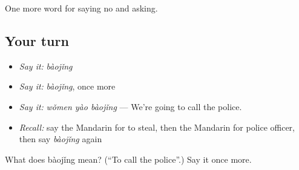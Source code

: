 \begin{grammarlens}[title={What you've built}]
One more word for saying no and asking.
\end{grammarlens}

\subsection*{Your turn}
\begin{itemize}
\raggedright
  \item \emph{Say it:} \emph{bàojǐng}
  \item \emph{Say it:} \emph{bàojǐng}, once more
  \item \emph{Say it:} \emph{wǒmen yào bàojǐng} — We're going to call the police.
  \item \emph{Recall:} say the Mandarin for to steal, then the Mandarin for police officer, then say \emph{bàojǐng} again
\end{itemize}

\begin{tcolorbox}[breakable,colback=teal!4,colframe=teal!35!black,title={Before you move on}]
What does bàojǐng mean? (\textquotedblleft{}To call the police\textquotedblright{}.) Say it once more.
\end{tcolorbox}

